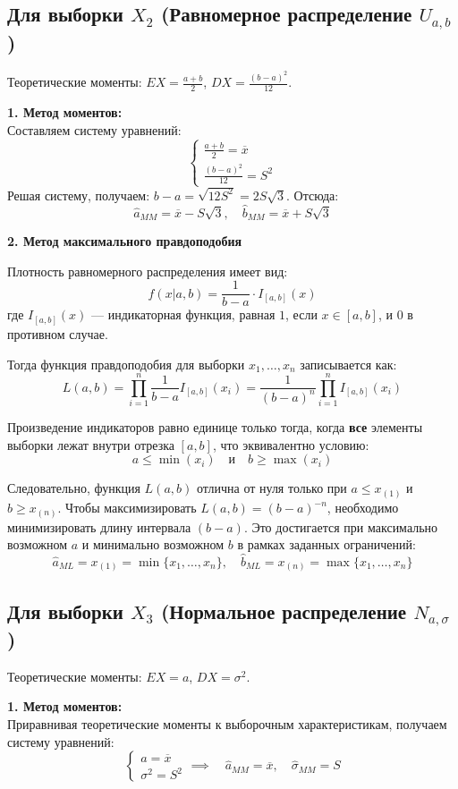 \documentclass[a4paper,12pt]{article}
\begin{document}
\subsection*{Для выборки $X_2$ (Равномерное распределение $U_{a,b}$)}

Теоретические моменты: $EX = \frac{a+b}{2}$, $DX = \frac{(b-a)^2}{12}$.

\textbf{1. Метод моментов:}\\
Составляем систему уравнений:
$$
\begin{cases}
\frac{a+b}{2} = \overline{x} \\
\frac{(b-a)^2}{12} = S^2
\end{cases}
$$
Решая систему, получаем: $b-a = \sqrt{12S^2} = 2S\sqrt{3}$. Отсюда:
$$
\hat{a}_{MM} = \overline{x} - S\sqrt{3}, \quad \hat{b}_{MM} = \overline{x} + S\sqrt{3}
$$

\textbf{2. Метод максимального правдоподобия}

Плотность равномерного распределения имеет вид:
\[ f(x|a,b) = \frac{1}{b-a} \cdot I_{[a, b]}(x) \]
где $I_{[a, b]}(x)$ --- индикаторная функция, равная $1$, если $x \in [a, b]$, и $0$ в противном случае. 

Тогда функция правдоподобия для выборки $x_1, \dots, x_n$ записывается как:
\[ L(a, b) = \prod_{i=1}^{n} \frac{1}{b-a} I_{[a, b]}(x_i) = \frac{1}{(b-a)^n} \prod_{i=1}^{n} I_{[a, b]}(x_i) \]

Произведение индикаторов равно единице только тогда, когда \textbf{все} элементы выборки лежат внутри отрезка $[a, b]$, что эквивалентно условию:
\[ a \le \min(x_i) \quad \text{и} \quad b \ge \max(x_i) \]

Следовательно, функция $L(a, b)$ отлична от нуля только при $a \le x_{(1)}$ и $b \ge x_{(n)}$. Чтобы максимизировать $L(a, b) = (b-a)^{-n}$, необходимо минимизировать длину интервала $(b-a)$. Это достигается при максимально возможном $a$ и минимально возможном $b$ в рамках заданных ограничений:
\[ \hat{a}_{ML} = x_{(1)} = \min\{x_1, \dots, x_n\}, \quad \hat{b}_{ML} = x_{(n)} = \max\{x_1, \dots, x_n\} \]

\subsection*{Для выборки $X_3$ (Нормальное распределение $N_{a, \sigma}$)}

Теоретические моменты: $EX = a$, $DX = \sigma^2$.

\textbf{1. Метод моментов:}\\
Приравнивая теоретические моменты к выборочным характеристикам, получаем систему уравнений:
$$
\begin{cases}
a = \overline{x} \\
\sigma^2 = S^2
\end{cases}
\implies \quad \hat{a}_{MM} = \overline{x}, \quad \hat{\sigma}_{MM} = S
$$
\end{document}
